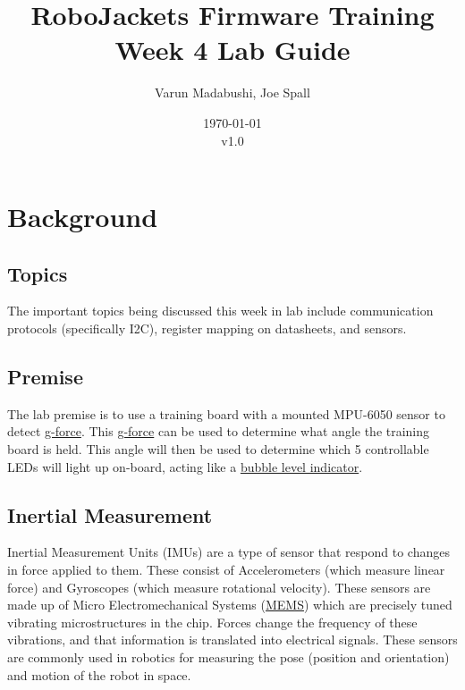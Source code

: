 \documentclass{article}
\title{RoboJackets Firmware Training Week 4 Lab Guide}
\author{Varun Madabushi, Joe Spall}
\date{\today\\v1.0}
\begin{document}
\maketitle{}
\setcounter{tocdepth}{2}
\tableofcontents
\pagebreak


\section{Background}
    \subsection{Topics}
        The important topics being discussed this week in lab include communication protocols (specifically I2C), register mapping on datasheets, and sensors.
    \subsection{Premise}
        The lab premise is to use a training board with a mounted MPU-6050 sensor to detect \href{https://en.wikipedia.org/wiki/G-force}{g-force}. This \href{https://upload.wikimedia.org/wikipedia/en/f/f5/G-Force_poster.jpg}{g-force} can be used to determine what angle the training board is held. This angle will then be used to determine which 5 controllable LEDs will light up on-board, acting like a \href{https://en.wikipedia.org/wiki/Spirit_level}{bubble level indicator}.
    \subsection{Inertial Measurement}
        Inertial Measurement Units (IMUs) are a type of sensor that respond to changes in force applied to them. These consist of Accelerometers (which measure linear force) and Gyroscopes (which measure rotational velocity). These sensors are made up of Micro Electromechanical Systems (\href{https://en.wikipedia.org/wiki/Microelectromechanical_systems}{MEMS}) which are precisely tuned vibrating microstructures in the chip. Forces change the frequency of these vibrations, and that information is translated into electrical signals. These sensors are commonly used in robotics for measuring the pose (position and orientation) and motion of the robot in space.
        
\end{document}
